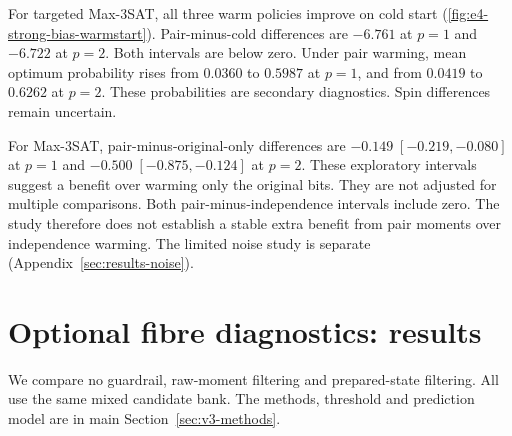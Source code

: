 \documentclass[a4paper,onecolumn,11pt,unpublished]{quantumarticle}
\theoremstyle{remark}
\begin{document}
\begin{table}[!htbp]
\centering\small
\caption{Corrected warm-start results on the 20 strongest-screened instances. We average three restarts, then form paired differences within each instance. Each family has ten instances. Intervals are exploratory 95\% Student-$t$ intervals, without adjustment for multiple comparisons. Negative differences favour the first policy.}
\label{tab:e4-strong-bias-warmstart}
\end{table}

For targeted Max-3SAT, all three warm policies improve on cold start
(\cref{fig:e4-strong-bias-warmstart}). Pair-minus-cold differences are
$-6.761$ at $p=1$ and $-6.722$ at $p=2$. Both intervals are below zero.
Under pair warming, mean optimum probability rises from $0.0360$ to
$0.5987$ at $p=1$, and from $0.0419$ to $0.6262$ at $p=2$.
These probabilities are secondary diagnostics. Spin differences remain
uncertain.

For Max-3SAT, pair-minus-original-only differences are
$-0.149\;[-0.219,-0.080]$ at $p=1$ and
$-0.500\;[-0.875,-0.124]$ at $p=2$.
These exploratory intervals suggest a benefit over warming only the
original bits. They are not adjusted for multiple comparisons.
Both pair-minus-independence intervals include zero.
The study therefore does not establish a stable extra benefit from pair
moments over independence warming.
The limited noise study is separate (Appendix~\ref{sec:results-noise}).

\FloatBarrier

\section{Optional fibre diagnostics: results}\label{supp:v3-diagnostics}
We compare no guardrail, raw-moment filtering and prepared-state filtering.
All use the same mixed candidate bank. The methods, threshold and prediction
model are in main Section~\ref{sec:v3-methods}.
\end{document}
